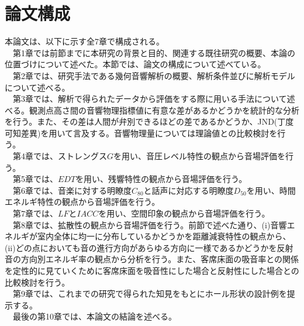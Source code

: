 \section{論文構成}
本論文は、以下に示す全7章で構成される。
\\　第1章では前節までに本研究の背景と目的、関連する既往研究の概要、本論の位置づけについて述べた。本節では、論文の構成について述べている。
\\　第2章では、研究手法である幾何音響解析の概要、解析条件並びに解析モデルについて述べる。
\\　第3章では、解析で得られたデータから評価をする際に用いる手法について述べる。観測点高さ間の音響物理指標値に有意な差があるかどうかを統計的な分析を行う。また、その差は人間が弁別できるほどの差であるかどうか、JND(丁度可知差異)を用いて言及する。音響物理量については理論値との比較検討を行う。
\\　第4章では、ストレングス$G$を用い、音圧レベル特性の観点から音場評価を行う。
\\　第5章では、$EDT$を用い、残響特性の観点から音場評価を行う。
\\　第6章では、音楽に対する明瞭度$C_{80}$と話声に対応する明瞭度$D_{50}$を用い、時間エネルギ特性の観点から音場評価を行う。
\\　第7章では、$LF$と$IACC$を用い、空間印象の観点から音場評価を行う。
\\　第8章では、拡散性の観点から音場評価を行う。前節で述べた通り、(i)音響エネルギが室内全体に均一に分布しているかどうかを距離減衰特性の観点から、(i\hspace{-.05em}i)どの点においても音の進行方向があらゆる方向に一様であるかどうかを反射音の方向別エネルギ率の観点から分析を行う。また、客席床面の吸音率との関係を定性的に見ていくために客席床面を吸音性にした場合と反射性にした場合との比較検討を行う。
\\　第9章では、これまでの研究で得られた知見をもとにホール形状の設計例を提示する。
\\　最後の第10章では、本論文の結論を述べる。
